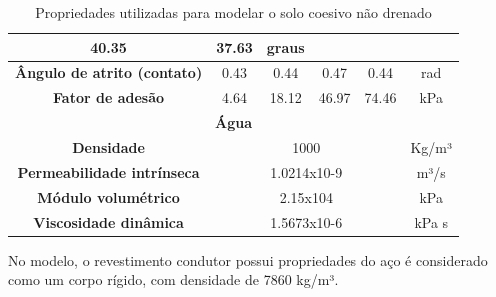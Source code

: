 \begin{table}[H]
\begin{tabular}{|cccccc|}
		\multicolumn{1}{c|}{40.35} &
		\multicolumn{1}{c|}{37.63} &
		graus \\ \hline
		\multicolumn{1}{|c|}{\textbf{Ângulo de atrito (contato)}} &
		\multicolumn{1}{c|}{0.43} &
		\multicolumn{1}{c|}{0.44} &
		\multicolumn{1}{c|}{0.47} &
		\multicolumn{1}{c|}{0.44} &
		rad \\ \hline
		\multicolumn{1}{|c|}{\textbf{Fator de adesão}} &
		\multicolumn{1}{c|}{4.64} &
		\multicolumn{1}{c|}{18.12} &
		\multicolumn{1}{c|}{46.97} &
		\multicolumn{1}{c|}{74.46} &
		kPa \\ \hline
		\multicolumn{6}{|c|}{\textbf{Água}} \\ \hline
		\multicolumn{1}{|c|}{\textbf{Densidade}} &
		\multicolumn{4}{c|}{1000} &
		Kg/m³ \\ \hline
		\multicolumn{1}{|c|}{\textbf{Permeabilidade intrínseca}} &
		\multicolumn{4}{c|}{1.0214x10-9} &
		m³/s \\ \hline
		\multicolumn{1}{|c|}{\textbf{Módulo volumétrico}} &
		\multicolumn{4}{c|}{2.15x104} &
		kPa \\ \hline
		\multicolumn{1}{|c|}{\textbf{Viscosidade dinâmica}} &
		\multicolumn{4}{c|}{1.5673x10-6} &
		kPa   s \\ \hline
	\end{tabular}
	\caption{Propriedades utilizadas para modelar o solo coesivo não drenado}
	\label{tab:propriedades_crav}
\end{table}

No modelo, o revestimento condutor possui propriedades do aço é considerado como um corpo rígido, com densidade de 7860 kg/m³.   